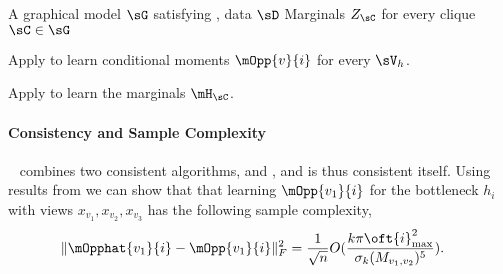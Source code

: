\renewcommand{\algorithmicrequire}{\textbf{Input:}}
\renewcommand{\algorithmicensure}{\textbf{Output:}}
\begin{algorithm}
  \caption{\LearnMarginals}
  \label{algo:directed}
  \begin{algorithmic}
    \REQUIRE A graphical model $\sG$ satisfying , data $\sD$
    \ENSURE Marginals $Z_\sC$ for every clique $\sC \in \sG$

        \STATE Apply \TensorFactorize to learn conditional moments
        $\mOpp{v}{i}$ for every $\sV_h$.

      \ENDFOR
  \STATE Apply \LearnClique to learn the marginals $\mH_\sC$.
\ENDFOR
  \end{algorithmic}
\end{algorithm}

\paragraph{Consistency and Sample Complexity}

\LearnMarginals~ combines two consistent algorithms, \TensorFactorize and
  \LearnClique, and is thus consistent itself. Using results from
  \citet{anandkumar12moments,anandkumar13tensor} we can show that that
  learning $\mOpp{v_1}{i}$ for the bottleneck $h_i$ with views $x_{v_1},
  x_{v_2}, x_{v_3}$ has the following sample complexity,
\begin{align*}
  \|\mOpphat{v_1}{i} - \mOpp{v_1}{i}\|^2_F &= \frac{1}{\sqrt{n}} O( \frac{k {\pi\oft{i}}_{\max}^2}{\sigma_k(M_{v_1,v_2})^5} ). 
\end{align*}

